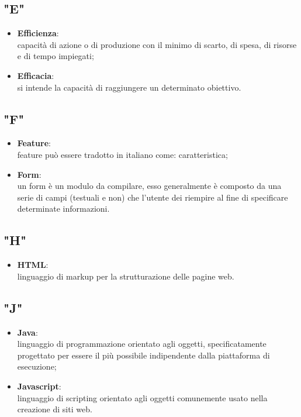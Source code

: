 \subsection{"E"}
\begin{itemize}
\item \textbf{Efficienza}:\\ capacità di azione o di produzione con il minimo di scarto, di spesa, di risorse e di tempo impiegati; 
\item \textbf{Efficacia}:\\ si intende la capacità di raggiungere un determinato obiettivo.
\end{itemize}

\subsection{"F"}
\begin{itemize}
\item \textbf{Feature}:\\ feature può essere tradotto in italiano come: caratteristica;
\item \textbf{Form}:\\ un form è un modulo da compilare, esso generalmente è composto da una serie di campi (testuali e non) che l'utente dei riempire al fine di specificare determinate informazioni.
\end{itemize}

\subsection{"H"}
\begin{itemize}
\item \textbf{HTML}:\\ linguaggio di markup per la strutturazione delle pagine web.
\end{itemize}

\subsection{"J"}
\begin{itemize}
\item \textbf{Java}:\\ linguaggio di programmazione orientato agli oggetti, specificatamente progettato per essere il più possibile indipendente dalla piattaforma di esecuzione;
\item \textbf{Javascript}:\\ linguaggio di scripting orientato agli oggetti comunemente usato nella creazione di siti web.
\end{itemize}


